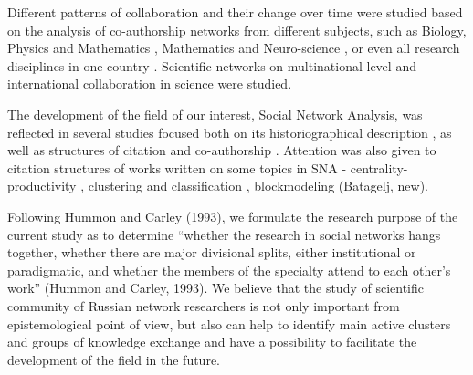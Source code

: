 \documentclass[11pt]{article} %
\newcommand{\Remark}[1]{\ifodd\value{page} \normalmarginpar
 \else \reversemarginpar \fi \marginpar{{\footnotesize #1}} }
\begin{document}
Different patterns of collaboration and their change over time were studied based on the analysis of co-authorship networks from different subjects, such as Biology, Physics and Mathematics \citep{newman1, newman4}, Mathematics and Neuro-science \citep{Evol}, or even all research disciplines in one country \citep{kroneg,ferligoj,cugmas}. Scientific networks on multinational level \citep{glaenzel} and international collaboration in science \citep{wagner}were studied.  \medskip 

The development of the field of our interest, Social Network Analysis, was reflected in several studies focused both on its historiographical description \citep{SNAdev}, as well as structures of citation \citep{normSci,Understand} and co-authorship \citep{SNAinf, leydes}. Attention was also given to citation structures of works written on some topics in SNA - centrality-productivity \citep{Understand,central}, clustering and classification \citep{central, kejzar}, blockmodeling (Batagelj, new). \medskip 

Following Hummon and Carley (1993), we formulate the research purpose of the current study as to determine “whether the research in social networks hangs together, whether there are major divisional splits, either institutional or paradigmatic, and whether the members of the specialty attend to each other’s work” (Hummon and Carley, 1993). We believe that the study of scientific community of Russian\Remark{Russian???} network researchers is not only important from epistemological point of view, but also can help to identify main active clusters and groups of knowledge exchange and have a possibility to facilitate the development of the field in the future.  \medskip  


\end{document}
